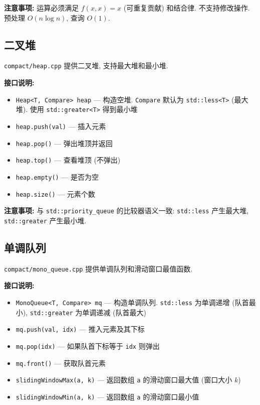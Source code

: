 \documentclass[a4paper]{ctexbook}
\begin{document}
\textbf{注意事项:} 运算必须满足 $f(x, x) = x$ (可重复贡献) 和结合律. 不支持修改操作. 预处理 $O(n \log n)$, 查询 $O(1)$.



\subsection{二叉堆}

\texttt{compact/heap.cpp} 提供二叉堆, 支持最大堆和最小堆.

\textbf{接口说明:}
\begin{itemize}
	\item \texttt{Heap<T, Compare> heap} — 构造空堆. \texttt{Compare} 默认为 \texttt{std::less<T>} (最大堆). 使用 \texttt{std::greater<T>} 得到最小堆
	\item \texttt{heap.push(val)} — 插入元素
	\item \texttt{heap.pop()} — 弹出堆顶并返回
	\item \texttt{heap.top()} — 查看堆顶 (不弹出)
	\item \texttt{heap.empty()} — 是否为空
	\item \texttt{heap.size()} — 元素个数
\end{itemize}

\textbf{注意事项:} 与 \texttt{std::priority\_queue} 的比较器语义一致: \texttt{std::less} 产生最大堆, \texttt{std::greater} 产生最小堆.



\subsection{单调队列}

\texttt{compact/mono\_queue.cpp} 提供单调队列和滑动窗口最值函数.

\textbf{接口说明:}
\begin{itemize}
	\item \texttt{MonoQueue<T, Compare> mq} — 构造单调队列. \texttt{std::less} 为单调递增 (队首最小), \texttt{std::greater} 为单调递减 (队首最大)
	\item \texttt{mq.push(val, idx)} — 推入元素及其下标
	\item \texttt{mq.pop(idx)} — 如果队首下标等于 \texttt{idx} 则弹出
	\item \texttt{mq.front()} — 获取队首元素
	\item \texttt{slidingWindowMax(a, k)} — 返回数组 \texttt{a} 的滑动窗口最大值 (窗口大小 $k$)
	\item \texttt{slidingWindowMin(a, k)} — 返回数组 \texttt{a} 的滑动窗口最小值
\end{itemize}
\end{document}
